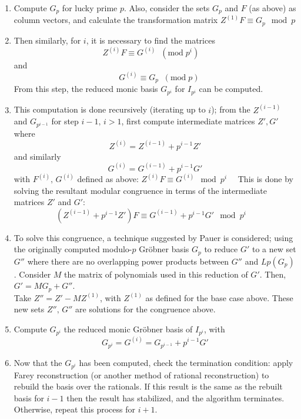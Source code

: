 \documentclass[letterpaper,12pt,titlepage,oneside,final]{book}
\begin{document}
\begin{enumerate}
  \item Compute ${G_p}$ for lucky prime ${p}$.  Also, consider the sets ${G_p}$ and ${F}$ (as above) as column vectors, and calculate the transformation matrix ${Z^{(1)}F \equiv G_p \mod p}$
  \item Then similarly, for ${i}$, it is necessary to find the matrices \begin{equation*} Z^{(i)}F \equiv G^{(i)} \;\; (\textrm{mod} \; p^i) \quad\end{equation*}and\begin{equation*}\quad G^{(i)} \equiv G_p \;\; (\textrm{mod} \; p)\end{equation*}From this step, the reduced monic basis ${G_{p^i}}$ for ${I_{p^i}}$ can be computed.
  \item This computation is done recursively (iterating up to ${i}$); from the ${Z^{(i-1)}}$ and ${G_{p^{i-1}}}$ for step ${i-1,\, i > 1}$, first compute intermediate matrices ${Z', G'}$ where
  \begin{equation*}
    Z^{(i)} = Z^{(i-1)} + p^{i-1}Z'
  \end{equation*}
  and similarly
  \begin{equation*}
    G^{(i)} = G^{(i-1)} + p^{i-1}G'
  \end{equation*}
  with ${F^{(i)},\, G^{(i)}}$ defined as above: ${Z^{(i)}F \equiv G^{(i)} \mod p^i \quad}$
  This is done by solving the resultant modular congruence in terms of the intermediate matrices ${Z'}$ and ${G'}$:
  \begin{equation*}
    (Z^{(i-1)} + p^{i-1}Z')F \equiv G^{(i-1)} + p^{i-1}G'\mod p^i \quad
  \end{equation*}
  \item To solve this congruence, a technique suggested by Pauer is considered; using the originally computed modulo-${p}$ Gr\"obner basis ${G_p}$ to reduce ${G'}$ to a new set ${G''}$ where there are no overlapping power products between ${G''}$ and ${Lp(G_p)}$.  Consider ${M}$ the matrix of polynomials used in this reduction of ${G'}$.  Then, ${G' = MG_p + G''}$.\\ Take ${Z'' = Z' - MZ^{(1)}}$, with ${Z^{(1)}}$ as defined for the base case above.  These new sets ${Z'',\, G''}$ are solutions for the congruence above.
  \item Compute ${G_{p^i}}$ the reduced monic Gr\"obner basis of ${I_{p^i}}$, with \begin{equation*}G_{p^i} = G^{(i)} = G_{p^{i-1}} + p^{i-1}G'\end{equation*}
  \item Now that the ${G_{p^i}}$ has been computed, check the termination condition: apply Farey reconstruction (or another method of rational reconstruction) to rebuild the basis over the rationals.  If this result is the same as the rebuilt basis for ${i-1}$ then the result has stabilized, and the algorithm terminates.  Otherwise, repeat this process for ${i+1}$.
\end{enumerate}      
\end{document}
